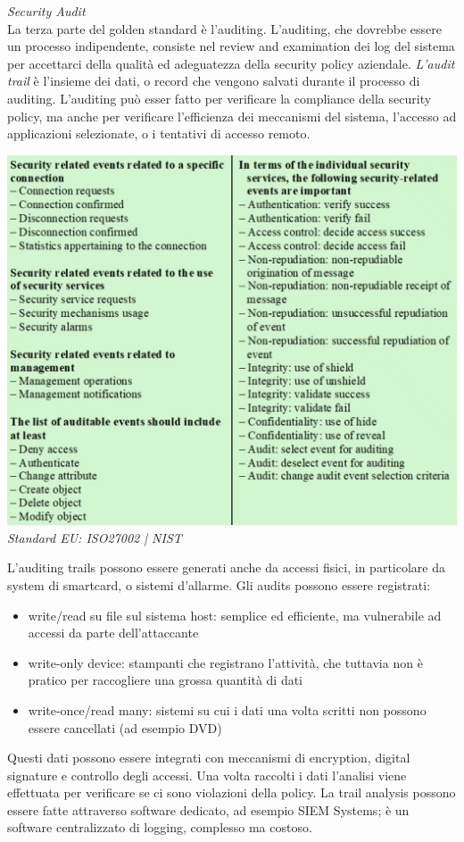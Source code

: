 \documentclass[11pt, oneside]{article}   	%
\begin{document}
 \emph{Security Audit}\\
La terza parte del golden standard è l'auditing.
L'auditing, che dovrebbe essere un processo indipendente, consiste nel review and examination dei log del sistema per accettarci della qualità ed adeguatezza della security policy aziendale. \emph{L'audit trail} è l'insieme dei dati, o record che vengono salvati durante il processo di auditing. L'auditing può esser fatto per verificare la compliance della security policy, ma anche per verificare l'efficienza dei meccanismi del sistema, l'accesso ad applicazioni selezionate, o i tentativi di accesso remoto.
 \begin{center}
\includegraphics[scale=0.4]{aud}\\
\emph{Standard EU: ISO27002 | NIST}
\end{center}
L'auditing trails possono essere generati anche da accessi fisici, in particolare da system di smartcard, o sistemi d'allarme. Gli audits possono essere registrati:
\begin{itemize}
\item write/read su file sul sistema host: semplice ed efficiente, ma vulnerabile ad accessi da parte dell'attaccante
\item write-only device: stampanti che registrano l'attività, che tuttavia non è pratico per raccogliere una grossa quantità di dati
\item write-once/read many: sistemi su cui i dati una volta scritti non possono essere cancellati (ad esempio DVD)
\end{itemize}
Questi dati possono essere integrati con meccanismi di encryption, digital signature e controllo degli accessi. Una volta raccolti i dati l'analisi viene effettuata per verificare se ci sono violazioni della policy.
La trail analysis possono essere fatte attraverso software dedicato, ad esempio SIEM Systems; è un software centralizzato di logging, complesso ma costoso.\\
\end{document}
